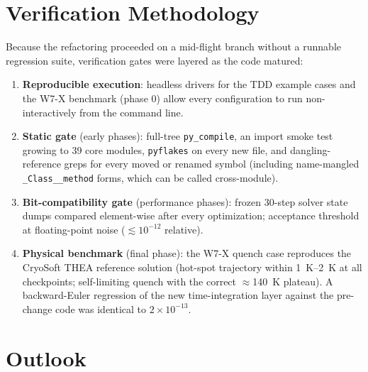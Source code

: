 \documentclass[11pt,a4paper]{article}
\newcommand{\code}[1]{\texttt{#1}}
\begin{document}
\section{Verification Methodology}

Because the refactoring proceeded on a mid-flight branch without a runnable regression
suite, verification gates were layered as the code matured:

\begin{enumerate}
  \item \textbf{Reproducible execution}: headless drivers for the TDD example cases
        and the W7-X benchmark (phase 0) allow every configuration to run
        non-interactively from the command line.
  \item \textbf{Static gate} (early phases): full-tree \code{py\_compile}, an import
        smoke test growing to 39 core modules, \code{pyflakes} on every new file, and
        dangling-reference greps for every moved or renamed symbol (including
        name-mangled \code{\_Class\_\_method} forms, which can be called cross-module).
  \item \textbf{Bit-compatibility gate} (performance phases): frozen 30-step solver
        state dumps compared element-wise after every optimization; acceptance
        threshold at floating-point noise ($\lesssim 10^{-12}$ relative).
  \item \textbf{Physical benchmark} (final phase): the W7-X quench case reproduces
        the CryoSoft THEA reference solution (hot-spot trajectory within
        \SIrange{1}{2}{K} at all checkpoints; self-limiting quench with the correct
        $\approx$\SI{140}{K} plateau). A backward-Euler regression of the new
        time-integration layer against the pre-change code was identical to
        $2\times10^{-13}$.
\end{enumerate}

\section{Outlook}
\end{document}
